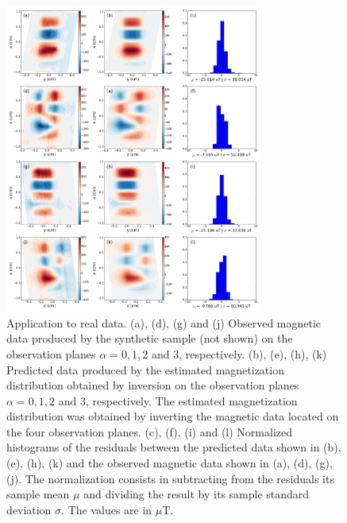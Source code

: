 \documentclass[draft,gc]{agutex}
\begin{document}
 \begin{figure}
 \noindent \includegraphics[width=20pc]{Figs/Fig14_LQ.png}
 \caption{Application to real data. (a), (d), (g) and (j) Observed
 magnetic data produced by the synthetic sample (not shown) on the
 observation planes $\alpha = 0, 1, 2$ and $3$, respectively.
 (b), (e), (h), (k) Predicted data produced by the estimated
 magnetization distribution obtained by inversion on the
 observation planes $\alpha = 0, 1, 2$ and $3$, respectively.
 The estimated magnetization distribution was obtained by
 inverting the magnetic data located on the four observation
 planes.
 (c), (f), (i) and (l) Normalized histograms of the residuals between the
 predicted data shown in (b), (e), (h), (k) and the 
 observed magnetic data shown in (a), (d), (g), (j). 
 The normalization
 consists in subtracting from the residuals its sample mean $\mu$ 
 and dividing the result by its sample standard deviation $\sigma$.
 The values are in $\mu$T.}
 \label{fig:datafit-real}
 \end{figure}
 
\end{document}
